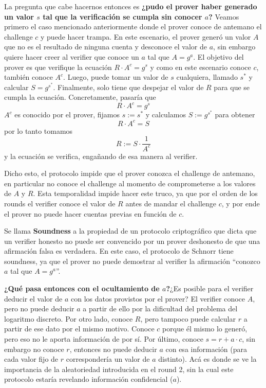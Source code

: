 La pregunta que cabe hacernos entonces es \textbf{¿pudo el prover haber generado un valor $s$ tal que la verificación se cumpla sin conocer $a$?} Veamos primero el caso mencionado anteriormente donde el prover conoce de antemano el challenge $c$ y puede hacer trampa. En este escenario, el prover generó un valor $A$ que no es el resultado de ninguna cuenta y desconoce el valor de $a$, sin embargo quiere hacer creer al verifier que conoce un $a$ tal que $A = g^a$. El objetivo del prover es que verifique la ecuación $R \cdot A^c = g^s$ y como en este escenario conoce $c$, también conoce $A^c$. Luego, puede tomar un valor de $s$ cualquiera, llamado $s^*$ y calcular $S = g^{s^*}$. Finalmente, solo tiene que despejar el valor de $R$ para que se cumpla la ecuación. Concretamente, pasaría que 
$$R \cdot A^c = g^s$$ $A^c$ es conocido por el prover, fijamos $s:=s^*$ y calculamos $S:=g^{s^*}$ para obtener
$$R\cdot A^c = S$$ por lo tanto tomamos
$$R := S \cdot \frac{1}{A^c}$$ y la ecuación se verifica, engañando de esa manera al verifier.

Dicho esto, el protocolo impide que el prover conozca el challenge de antemano, en particular no conoce el challenge al momento de comprometerse a los valores de $A$ y $R$. Esta temporalidad impide hacer este truco, ya que por el orden de los rounds el verifier conoce el valor de $R$ antes de mandar el challenge $c$, y por ende el prover no puede hacer cuentas previas en función de $c$. 


Se llama \textbf{Soundness} a la propiedad de un protocolo criptográfico que dicta que un verifier honesto no puede ser convencido por un prover deshonesto de que una afirmación falsa es verdadera. En este caso, el protocolo de Schnorr tiene soundness, ya que el prover no puede demostrar al verifier la afirmación “conozco $a$ tal que $A = g^a$''.

\textbf{¿Qué pasa entonces con el ocultamiento de $a$?}¿Es posible para el verifier deducir el valor de $a$ con los datos provistos por el prover? El verifier conoce $A$, pero no puede deducir $a$ a partir de ello por la dificultad del problema del logaritmo discreto. Por otro lado, conoce $R$, pero tampoco puede calcular $r$ a partir de ese dato por el mismo motivo. Conoce $c$ porque él mismo lo generó, pero eso no le aporta información de por sí. Por último, conoce $s = r + a\cdot c$, sin embargo no conoce $r$, entonces no puede deducir $a$ con esa información (para cada valor fijo de $r$ correspondería un valor de $a$ distinto). Acá es donde se ve la importancia de la aleatoriedad introducida en el round 2, sin la cual este protocolo estaría revelando información confidencial ($a$). 

